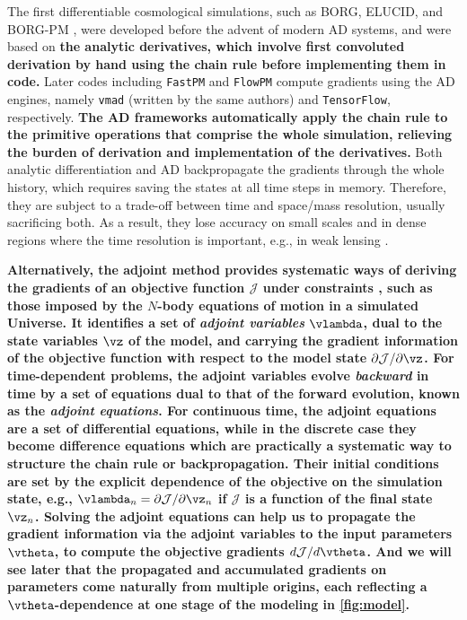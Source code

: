 \documentclass[modern, dvipsnames]{aastex631}
\renewcommand{\d}{d}
\newcommand{\p}{\partial}
\newcommand{\cJ}{\mathcal{J}}
\newcommand{\HL}[1]{\textcolor{Bittersweet}{\textbf{#1}}}
\begin{document}
The first differentiable cosmological simulations, such as BORG, ELUCID,
and BORG-PM \citep{BORG, ELUCID, BORG-PM}, were developed before the
advent of modern AD systems, and were based on \HL{the analytic derivatives,
which involve first convoluted derivation by hand using the chain rule
\citep[see e.g.,][App.~D]{SeljakEtAl2017} before implementing them in
code.}
Later codes including \texttt{FastPM} and \texttt{FlowPM} \citep{FastPM,
vmad, SeljakEtAl2017, FlowPM} compute gradients using the AD engines,
namely \texttt{vmad} (written by the same authors) and
\texttt{TensorFlow}, respectively.
\HL{The AD frameworks automatically apply the chain rule to the primitive
operations that comprise the whole simulation, relieving the burden of
derivation and implementation of the derivatives.}
Both analytic differentiation and AD backpropagate the gradients through
the whole history, which requires saving the states at all time steps in
memory.
Therefore, they are subject to a trade-off between time and space/mass
resolution, usually sacrificing both.
As a result, they lose accuracy on small scales and in dense regions
where the time resolution is important, e.g., in weak lensing
\citep{MADLens}.

\HL{Alternatively, the adjoint method provides systematic ways of deriving
the gradients of an objective function $\cJ$ under constraints
\citep{Pontryagin1962}, such as those imposed by the $N$-body equations
of motion in a simulated Universe.
It identifies a set of \emph{adjoint variables} $\vlambda$, dual to the
state variables $\vz$ of the model, and carrying the gradient
information of the objective function with respect to the model state
$\p\cJ / \p\vz$.
For time-dependent problems, the adjoint variables evolve
\emph{backward} in time by a set of equations dual to that of the
forward evolution, known as the \emph{adjoint equations}.
For continuous time, the adjoint equations are a set of differential
equations, while in the discrete case they become difference equations
which are practically a systematic way to structure the chain rule or
backpropagation.
Their initial conditions are set by the explicit dependence of the
objective on the simulation state, e.g., $\vlambda_n = \p\cJ / \p\vz_n$
if $\cJ$ is a function of the final state $\vz_n$.
Solving the adjoint equations can help us to propagate the gradient
information via the adjoint variables to the input parameters $\vtheta$,
to compute the objective gradients $\d\cJ / \d\vtheta$.
And we will see later that the propagated and accumulated gradients on
parameters come naturally from multiple origins, each reflecting a
$\vtheta$-dependence at one stage of the modeling in
\autoref{fig:model}.}
\end{document}
